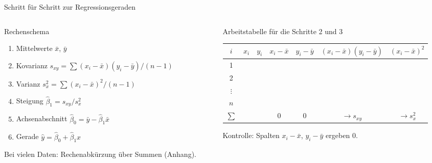 \documentclass[aspectratio=169,11pt]{beamer}
\begin{document}
\begin{frame}{Schritt für Schritt zur Regressionsgeraden}
  \begin{columns}[T]
    \begin{column}{0.4\textwidth}
      \begin{block}{Rechenschema}
        \small
        \begin{enumerate}
          \setlength{\itemsep}{1pt}
          \item Mittelwerte $\bar{x}$, $\bar{y}$
          \item Kovarianz $s_{xy} = \sum (x_i-\bar{x})(y_i-\bar{y}) / (n-1)$
          \item Varianz $s_x^{2} = \sum (x_i-\bar{x})^{2} / (n-1)$
          \item Steigung $\hat{\beta}_1 = s_{xy} / s_x^{2}$
          \item Achsenabschnitt $\hat{\beta}_0 = \bar{y} - \hat{\beta}_1 \bar{x}$
          \item Gerade $\hat{y} = \hat{\beta}_0 + \hat{\beta}_1 x$
        \end{enumerate}
      \end{block}
      \footnotesize Bei vielen Daten: Rechenabkürzung über Summen (Anhang).
    \end{column}
    \begin{column}{0.58\textwidth}
      \begin{block}{Arbeitstabelle für die Schritte 2 und 3}
        \begin{center}
          \scriptsize
          \renewcommand{\arraystretch}{1.2}
          \setlength{\tabcolsep}{3pt}
          \begin{tabular}{ccccccc}
            \toprule
            $i$ & $x_i$ & $y_i$ & $x_i-\bar{x}$ & $y_i-\bar{y}$ & $(x_i-\bar{x})(y_i-\bar{y})$ & $(x_i-\bar{x})^{2}$ \\
            \midrule
            1 & & & & & & \\
            2 & & & & & & \\
            $\vdots$ & & & & & & \\
            $n$ & & & & & & \\
            \midrule
            $\sum$ & & & $0$ & $0$ & $\to s_{xy}$ & $\to s_x^{2}$ \\
            \bottomrule
          \end{tabular}
        \end{center}
        \small Kontrolle: Spalten $x_i-\bar{x}$, $y_i-\bar{y}$ ergeben $0$.
      \end{block}
    \end{column}
  \end{columns}
\end{frame}
\end{document}
